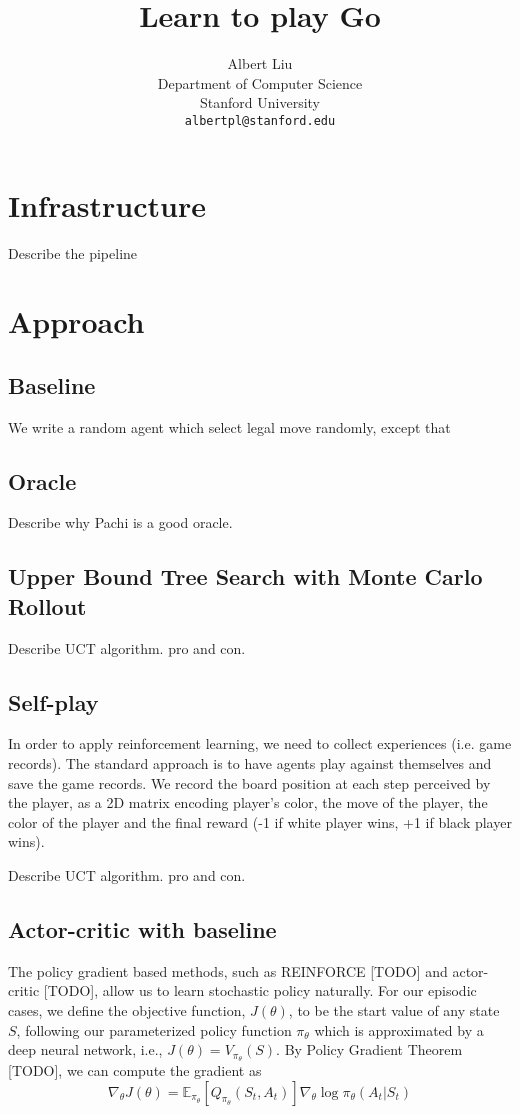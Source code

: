 \documentclass{article}
\title{Learn to play Go}
\author{%
  Albert Liu \\
  Department of Computer Science\\
  Stanford University\\
  \texttt{albertpl@stanford.edu} \\
}
\begin{document}
\maketitle

\section{Infrastructure}
Describe the pipeline

\section{Approach}
\subsection{Baseline}
    We write a random agent which select legal move randomly, except that 

\subsection{Oracle}
    Describe why Pachi is a good oracle.

\subsection{Upper Bound Tree Search with Monte Carlo Rollout}
Describe UCT algorithm. pro and con.

\subsection{Self-play}
In order to apply reinforcement learning, we need to collect experiences (i.e. game records). The standard approach is to have agents play against themselves and save the game records. We record the board position at each step perceived by the player, as a 2D matrix encoding player's color, the move of the player, the color of the player and the final reward (-1 if white player wins, +1 if black player wins).

Describe UCT algorithm. pro and con.
\subsection{Actor-critic with baseline}
The policy gradient based methods, such as REINFORCE [TODO] and actor-critic [TODO], allow us to learn stochastic policy naturally. For our episodic cases, we define the objective function, $J(\theta)$, to be the start value of any state $S$, following our parameterized policy function $\pi_{\theta}$ which is approximated by a deep neural network, i.e.,  $J(\theta) = V_{\pi_{\theta}}(S)$. By Policy Gradient Theorem [TODO], we can compute the gradient as
$$ \nabla_{\theta} J(\theta) =  \mathbb E_{\pi_{\theta}} [ 
Q_{\pi_{\theta}}(S_t, A_t)] 
\nabla_{\theta} \log \pi_{\theta}(A_t|S_t) 
$$
\end{document}
